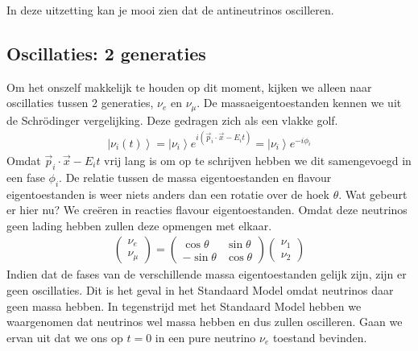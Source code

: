 \documentclass[../main.tex]{subfiles}
\begin{document}
In deze uitzetting kan je mooi zien dat de antineutrinos oscilleren.

\subsection{Oscillaties: 2 generaties}%
\label{sub:oscillaties_2_generaties}

Om het onszelf makkelijk te houden op dit moment, kijken we alleen naar oscillaties tussen 2 generaties, $\nu_e$ en $\nu_\mu$. De massaeigentoestanden kennen we uit de Schrödinger vergelijking. Deze gedragen zich als een vlakke golf.
\begin{equation}
    \begin{aligned}
        \label{eq:massa_eigentoestanden_neutrinos}
        \left|\nu_{i}(t)\right>=\left| \nu_{i}\right>e^{i\left(\vec{p}_{i} \cdot \vec{x}-E_{i} t\right)}=\left| \nu_{i}\right>e^{-i \phi_{i}}
    \end{aligned}
\end{equation}
Omdat $\vec{p}_{i} \cdot \vec{x}-E_{i} t$ vrij lang is om op te schrijven hebben we dit samengevoegd in een fase $\phi_i$. De relatie tussen de massa eigentoestanden en flavour eigentoestanden is weer niets anders dan een rotatie over de hoek $\theta$. Wat gebeurt er hier nu? We creëren in reacties flavour eigentoestanden. Omdat deze neutrinos geen lading hebben zullen deze opmengen met elkaar.
\begin{equation}
    \begin{aligned}
        \label{eq:neutrino_2_gen_opmenging}
        \left(\begin{array}{c}
                \nu_{e} \\
                \nu_{\mu}
                \end{array}\right)=\left(\begin{array}{cc}
                \cos \theta & \sin \theta \\
                -\sin \theta & \cos \theta
                \end{array}\right)\left(\begin{array}{l}
                \nu_{1} \\
                \nu_{2}
        \end{array}\right)
    \end{aligned}
\end{equation}
Indien dat de fases van de verschillende massa eigentoestanden gelijk zijn, zijn er geen oscillaties. Dit is het geval in het Standaard Model omdat neutrinos daar geen massa hebben. In tegenstrijd met het Standaard Model hebben we waargenomen dat neutrinos wel massa hebben en dus zullen oscilleren. Gaan we ervan uit dat we ons op $t=0$ in een pure neutrino $\nu_e$ toestand bevinden.
\end{document}
